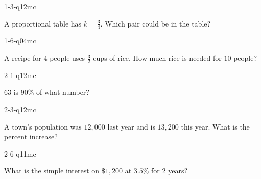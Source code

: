 
\begin{practiceQuestion}{1-3-q12}{mc}
\begin{questionText}
A proportional table has $k = \frac{3}{4}$. Which pair could be in the table?
\end{questionText}
\end{practiceQuestion}

\begin{practiceQuestion}{1-6-q04}{mc}
\begin{questionText}
A recipe for $4$ people uses $\frac{3}{2}$ cups of rice. How much rice is needed for $10$ people?
\end{questionText}
\end{practiceQuestion}

\begin{practiceQuestion}{2-1-q12}{mc}
\begin{questionText}
$63$ is $90\%$ of what number?
\end{questionText}
\end{practiceQuestion}

\begin{practiceQuestion}{2-3-q12}{mc}
\begin{questionText}
A town's population was $12{,}000$ last year and is $13{,}200$ this year. What is the percent increase?
\end{questionText}
\end{practiceQuestion}

\begin{practiceQuestion}{2-6-q11}{mc}
\begin{questionText}
What is the simple interest on $\$1{,}200$ at $3.5\%$ for $2$ years?
\end{questionText}
\end{practiceQuestion}

